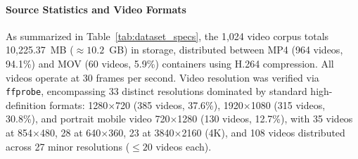 \documentclass[preprint,12pt]{elsarticle}
\newcommand{\rv}[1]{{\color{red}#1}}
\begin{document}
\paragraph{Source Statistics and Video Formats} As summarized in Table~\ref{tab:dataset_specs}, the 1,024 video corpus totals 10,225.37~MB ($\approx 10.2$~GB) in storage, distributed between MP4 (964 videos, 94.1\%) and MOV (60 videos, 5.9\%) containers using H.264 compression. All videos operate at 30 frames per second. Video resolution was verified via \texttt{ffprobe}, encompassing 33 distinct resolutions dominated by standard high-definition formats: 1280$\times$720 (385 videos, 37.6\%), 1920$\times$1080 (315 videos, 30.8\%), and portrait mobile video 720$\times$1280 (130 videos, 12.7\%), with 35 videos at 854$\times$480, 28 at 640$\times$360, 23 at 3840$\times$2160 (4K), and 108 videos distributed across 27 minor resolutions ($\le 20$ videos each).


\end{document}
